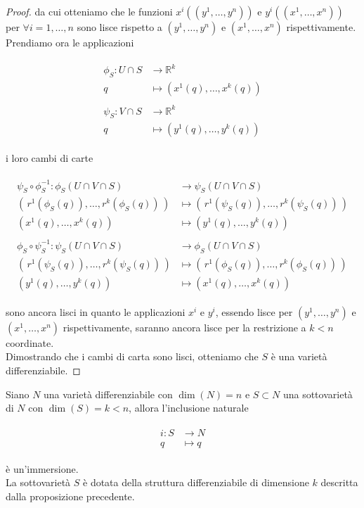 \begin{proof}
	da cui otteniamo che le funzioni $ x^{i}((y^{1},\dots,y^{n})) $ e $ y^{i}((x^{1},\dots,x^{n})) $ per $ \forall i=1,\dots,n $ sono lisce rispetto a $ (y^{1},\dots,y^{n}) $ e $ (x^{1},\dots,x^{n}) $ rispettivamente.\\
	Prendiamo ora le applicazioni
	
	\begin{align}
		\begin{split}
			\phi_{S} : U \cap S &\to \mathbb{R}^{k}\\
			q &\mapsto (x^{1}(q),\dots,x^{k}(q))\\\\
			\psi_{S} :V \cap S &\to \mathbb{R}^{k}\\
			q &\mapsto (y^{1}(q),\dots,y^{k}(q))
		\end{split}
	\end{align}

	i loro cambi di carte
	
	\begin{align}
		\begin{split}
			\psi_{S} \circ \phi_{S}^{-1} : \phi_{S}(U \cap V \cap S) &\to \psi_{S}(U \cap V \cap S)\\
			(\, r^{1}(\phi_{S}(q)),\dots,r^{k}(\phi_{S}(q)) \,) &\mapsto (\, r^{1}(\psi_{S}(q)),\dots,r^{k}(\psi_{S}(q)) \,)\\
			(x^{1}(q),\dots,x^{k}(q)) &\mapsto (y^{1}(q),\dots,y^{k}(q))\\\\
			\phi_{S} \circ \psi_{S}^{-1} : \psi_{S}(U \cap V \cap S) &\to \phi_{S}(U \cap V \cap S)\\
			(\, r^{1}(\psi_{S}(q)),\dots,r^{k}(\psi_{S}(q)) \,) &\mapsto (\, r^{1}(\phi_{S}(q)),\dots,r^{k}(\phi_{S}(q)) \,)\\
			(y^{1}(q),\dots,y^{k}(q)) &\mapsto (x^{1}(q),\dots,x^{k}(q))
		\end{split}
	\end{align}

	sono ancora lisci in quanto le applicazioni $ x^{i} $ e $ y^{i} $, essendo lisce per $ (y^{1},\dots,y^{n}) $ e $ (x^{1},\dots,x^{n}) $ rispettivamente, saranno ancora lisce per la restrizione a $ k<n $ coordinate.\\
	Dimostrando che i cambi di carta sono lisci, otteniamo che $ S $ è una varietà differenziabile.
\end{proof}

\begin{definition}
	Siano $ N $ una varietà differenziabile con $ \dim(N)=n $ e $ S \subset N $ una sottovarietà di $ N $ con $ \dim(S)=k<n $, allora l'inclusione naturale
	
	\begin{align}
		\begin{split}
			i : S &\to N\\
			q &\mapsto q
		\end{split}
	\end{align}

	è un'immersione.\\
	La sottovarietà $ S $ è dotata della struttura differenziabile di dimensione $ k $ descritta dalla proposizione precedente.
\end{definition}

